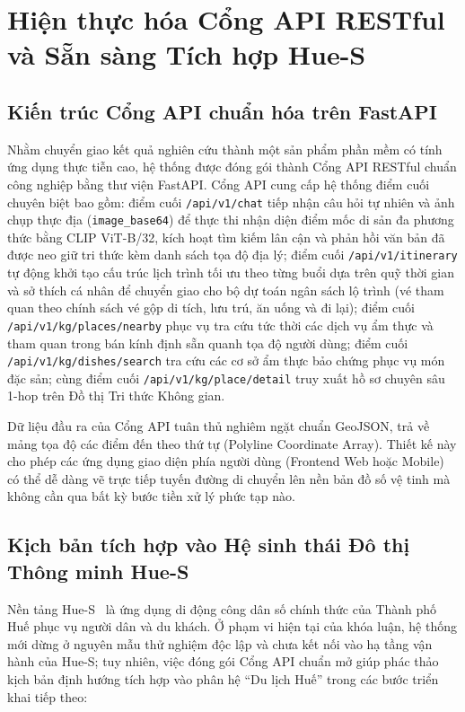 \section{Hiện thực hóa Cổng API RESTful và Sẵn sàng Tích hợp Hue-S}
\label{sec:ch2-api-hues}

\subsection{Kiến trúc Cổng API chuẩn hóa trên FastAPI}
\label{subsec:ch2-api-architecture}

Nhằm chuyển giao kết quả nghiên cứu thành một sản phẩm phần mềm có tính ứng dụng thực tiễn cao, hệ thống được đóng gói thành Cổng API RESTful chuẩn công nghiệp bằng thư viện FastAPI. Cổng API cung cấp hệ thống điểm cuối chuyên biệt bao gồm: điểm cuối \texttt{/api/v1/chat} tiếp nhận câu hỏi tự nhiên và ảnh chụp thực địa (\texttt{image\_base64}) để thực thi nhận diện điểm mốc di sản đa phương thức bằng CLIP ViT-B/32, kích hoạt tìm kiếm lân cận và phản hồi văn bản đã được neo giữ tri thức kèm danh sách tọa độ địa lý; điểm cuối \texttt{/api/v1/itinerary} tự động khởi tạo cấu trúc lịch trình tối ưu theo từng buổi dựa trên quỹ thời gian và sở thích cá nhân để chuyển giao cho bộ dự toán ngân sách lộ trình (vé tham quan theo chính sách vé gộp di tích, lưu trú, ăn uống và đi lại); điểm cuối \texttt{/api/v1/kg/places/nearby} phục vụ tra cứu tức thời các dịch vụ ẩm thực và tham quan trong bán kính định sẵn quanh tọa độ người dùng; điểm cuối \texttt{/api/v1/kg/dishes/search} tra cứu các cơ sở ẩm thực bảo chứng phục vụ món đặc sản; cùng điểm cuối \texttt{/api/v1/kg/place/detail} truy xuất hồ sơ chuyên sâu 1-hop trên Đồ thị Tri thức Không gian.

Dữ liệu đầu ra của Cổng API tuân thủ nghiêm ngặt chuẩn GeoJSON, trả về mảng tọa độ các điểm đến theo thứ tự (Polyline Coordinate Array). Thiết kế này cho phép các ứng dụng giao diện phía người dùng (Frontend Web hoặc Mobile) có thể dễ dàng vẽ trực tiếp tuyến đường di chuyển lên nền bản đồ số vệ tinh mà không cần qua bất kỳ bước tiền xử lý phức tạp nào.

\subsection{Kịch bản tích hợp vào Hệ sinh thái Đô thị Thông minh Hue-S}
\label{subsec:ch2-hues-integration}

Nền tảng Hue-S~\cite{hues2024} là ứng dụng di động công dân số chính thức của Thành phố Huế phục vụ người dân và du khách. Ở phạm vi hiện tại của khóa luận, hệ thống mới dừng ở nguyên mẫu thử nghiệm độc lập và chưa kết nối vào hạ tầng vận hành của Hue-S; tuy nhiên, việc đóng gói Cổng API chuẩn mở giúp phác thảo kịch bản định hướng tích hợp vào phân hệ ``Du lịch Huế'' trong các bước triển khai tiếp theo:

